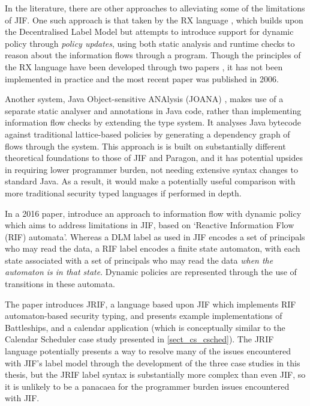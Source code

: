 In the literature, there are other approaches to alleviating some of the limitations of JIF. One such approach is that taken by the RX language \cite{swamy06rx}, which builds upon the Decentralised Label Model but attempts to introduce support for dynamic policy through \textit{policy updates}, using both static analysis and runtime checks to reason about the information flows through a program. Though the principles of the RX language have been developed through two papers \cite{swamy06rx}\cite{hicks05rx}, it has not been implemented in practice and the most recent paper was published in 2006.

Another system, Java Object-sensitive ANAlysis (JOANA) \cite{graf2013joana}, makes use of a separate static analyser and annotations in Java code, rather than implementing information flow checks by extending the type system. It analyses Java bytecode against traditional lattice-based policies by generating a dependency graph of flows through the system. This approach is is built on substantially different theoretical foundations to those of JIF and Paragon, and it has potential upsides in requiring lower programmer burden, not needing extensive syntax changes to standard Java. As a result, it would make a potentially useful comparison with more traditional security typed languages if performed in depth.

In a 2016 paper, \citeauthor{kozyri2016jrif} \cite{kozyri2016jrif} introduce an approach to information flow with dynamic policy which aims to address limitations in JIF, based on `Reactive Information Flow (RIF) automata'. Whereas a DLM label as used in JIF encodes a set of principals who may read the data, a RIF label encodes a finite state automaton, with each state associated with a set of principals who may read the data \textit{when the automaton is in that state}. Dynamic policies are represented through the use of transitions in these automata.

The paper \cite{kozyri2016jrif} introduces JRIF, a language based upon JIF which implements RIF automaton-based security typing, and presents example implementations of Battleships, and a calendar application (which is conceptually similar to the Calendar Scheduler case study presented in \ref{sect_cs_csched}). The JRIF language potentially presents a way to resolve many of the issues encountered with JIF's label model through the development of the three case studies in this thesis, but the JRIF label syntax is substantially more complex than even JIF, so it is unlikely to be a panacaea for the programmer burden issues encountered with JIF.

